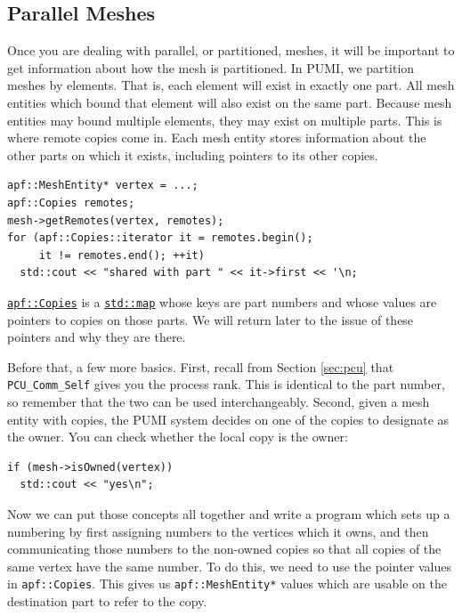 \documentclass{article}
\begin{document}
\subsection{Parallel Meshes}

Once you are dealing with parallel, or partitioned, meshes,
it will be important to get information about how the
mesh is partitioned.
In PUMI, we partition meshes by elements.
That is, each element will exist in exactly one part.
All mesh entities which bound that element will also exist on
the same part.
Because mesh entities may bound multiple elements, they may
exist on multiple parts.
This is where remote copies come in.
Each mesh entity stores information about the other parts
on which it exists, including pointers to its other copies.

\begin{lstlisting}
apf::MeshEntity* vertex = ...;
apf::Copies remotes;
mesh->getRemotes(vertex, remotes);
for (apf::Copies::iterator it = remotes.begin();
     it != remotes.end(); ++it)
  std::cout << "shared with part " << it->first << '\n;
\end{lstlisting}

\href{http://scorec.rpi.edu/~dibanez/core/namespaceapf.html#a4fdcb1e40963596d8345f0328e7d65b1}{\texttt{apf::Copies}}
is a
\href{http://www.cplusplus.com/reference/map/map/}{\texttt{std::map}}
whose keys are part numbers and whose
values are pointers to copies on those parts.
We will return later to the issue of these pointers and
why they are there.

Before that, a few more basics.
First, recall from Section \ref{sec:pcu} that \texttt{PCU\_Comm\_Self}
gives you the process rank.
This is identical to the part number, so remember that the two
can be used interchangeably.
Second, given a mesh entity with copies, the PUMI system decides
on one of the copies to designate as the owner.
You can check whether the local copy is the owner:

\begin{lstlisting}
if (mesh->isOwned(vertex))
  std::cout << "yes\n";
\end{lstlisting}

Now we can put those concepts all together and write a program
which sets up a numbering by first assigning numbers to
the vertices which it owns, and then communicating those
numbers to the non-owned copies so that all copies
of the same vertex have the same number.
To do this, we need to use the pointer values in \texttt{apf::Copies}.
This gives us \texttt{apf::MeshEntity*} values which are usable
on the destination part to refer to the copy.
\end{document}
